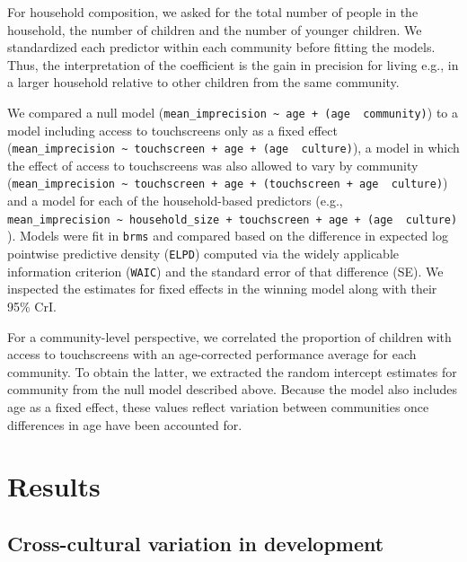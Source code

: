 \documentclass[
  man,floatsintext]{apa7}
\begin{document}
For household composition, we asked for the total number of people in the household, the number of children and the number of younger children. We standardized each predictor within each community before fitting the models. Thus, the interpretation of the coefficient is the gain in precision for living e.g., in a larger household relative to other children from the same community.

We compared a null model (\texttt{mean\_imprecision\ \textasciitilde{}\ age\ +\ (age\ \textbar{}\ community)}) to a model including access to touchscreens only as a fixed effect (\texttt{mean\_imprecision\ \textasciitilde{}\ touchscreen\ +\ age\ +\ (age\ \textbar{}\ culture)}), a model in which the effect of access to touchscreens was also allowed to vary by community (\texttt{mean\_imprecision\ \textasciitilde{}\ touchscreen\ +\ age\ +\ (touchscreen\ +\ age\ \textbar{}\ culture)}) and a model for each of the household-based predictors (e.g., \texttt{mean\_imprecision\ \textasciitilde{}\ household\_size\ +\ touchscreen\ +\ age\ +\ (age\ \textbar{}\ culture)}). Models were fit in \texttt{brms} and compared based on the difference in expected log pointwise predictive density (\texttt{ELPD}) computed via the widely applicable information criterion (\texttt{WAIC}) and the standard error of that difference (SE). We inspected the estimates for fixed effects in the winning model along with their 95\% CrI.

For a community-level perspective, we correlated the proportion of children with access to touchscreens with an age-corrected performance average for each community. To obtain the latter, we extracted the random intercept estimates for community from the null model described above. Because the model also includes age as a fixed effect, these values reflect variation between communities once differences in age have been accounted for.

\section{Results}\label{results}

\subsection{Cross-cultural variation in development}\label{cross-cultural-variation-in-development}
\end{document}
